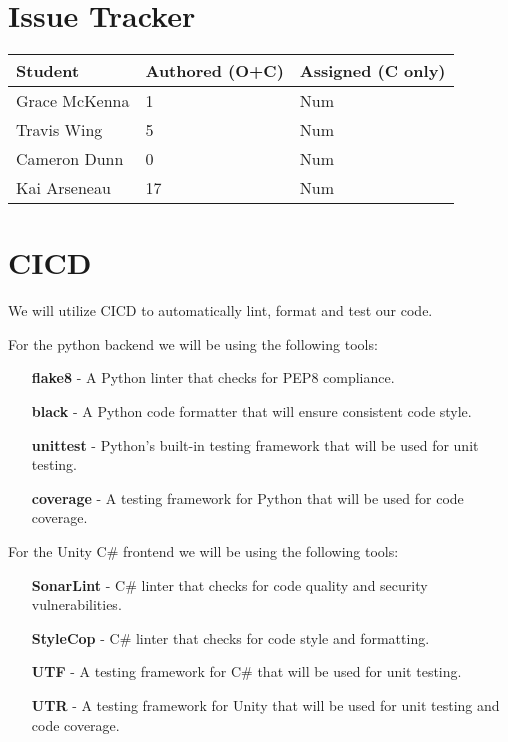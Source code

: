\documentclass{article}
\begin{document}
\section{Issue Tracker}


\begin{table}[H]
\centering
\begin{tabular}{lll}
\toprule
\textbf{Student} & \textbf{Authored (O+C)} & \textbf{Assigned (C only)}\\
\midrule
Grace McKenna & 1 & Num \\
Travis Wing & 5 & Num \\
Cameron Dunn & 0 & Num \\
Kai Arseneau & 17 & Num \\
\bottomrule
\end{tabular}
\end{table}


\section{CICD}

We will utilize CICD to automatically lint, format and test our code. 

For the python backend we will be using the following tools:
\begin{itemize}
  \item [\textbf{flake8}] - A Python linter that checks for PEP8 compliance.
  \item [\textbf{black}] - A Python code formatter that will ensure consistent code style.
  \item [\textbf{unittest}] - Python's built-in testing framework that will be used for unit testing.
  \item [\textbf{coverage}] - A testing framework for Python that will be used for code coverage.
\end{itemize}

\bigskip
\noindent For the Unity C\# frontend we will be using the following tools:
\begin{itemize}
  \item [\textbf{SonarLint}] - C\# linter that checks for code quality and security vulnerabilities.
  \item [\textbf{StyleCop}] - C\# linter that checks for code style and formatting.
  \item [\textbf{UTF}] - A testing framework for C\# that will be used for unit testing.
  \item [\textbf{UTR}] - A testing framework for Unity that will be used for unit testing and code coverage.
\end{itemize}
\end{document}
